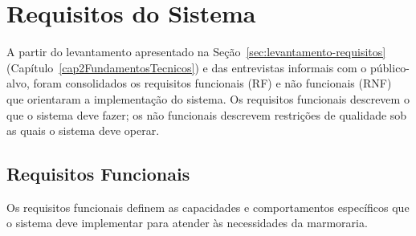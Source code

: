 \section{Requisitos do Sistema}
\label{sec:requisitos-sistema}

A partir do levantamento apresentado na Seção~\ref{sec:levantamento-requisitos} (Capítulo~\ref{cap2FundamentosTecnicos}) e das entrevistas informais com o público-alvo, foram consolidados os requisitos funcionais (RF) e não funcionais (RNF) que orientaram a implementação do sistema. Os requisitos funcionais descrevem o que o sistema deve fazer; os não funcionais descrevem restrições de qualidade sob as quais o sistema deve operar.

\subsection{Requisitos Funcionais}
\label{sec:requisitos-funcionais}

Os requisitos funcionais definem as capacidades e comportamentos específicos que o sistema deve implementar para atender às necessidades da marmoraria.


